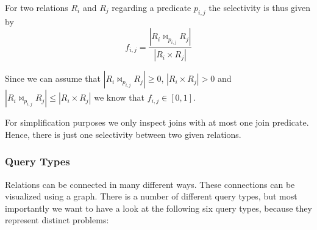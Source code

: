 For two relations $R_i$ and $R_j$ regarding a predicate $p_{i,j}$ the selectivity is thus given by 
\begin{equation}
f_{i,j} = \frac{|R_i\Join_{p_{i,j}}R_j|}{|R_i \times R_j|}	
\end{equation}

\begin{note}
Since we can assume that $|R_i\Join_{p_{i,j}}R_j| \geq 0$, $|R_i \times R_j| > 0$ and $|R_i\Join_{p_{i,j}}R_j| \leq |R_i \times R_j|$ we know that $f_{i,j} \in [0,1]$.
\end{note}

For simplification purposes we only inspect joins with at most one join predicate. Hence, there is just one selectivity between two given relations.

\subsubsection{Query Types}
\label{subsub:query-types}

Relations can be connected in many different ways. These connections can be visualized using a graph. There is a number of different query types, but most importantly we want to have a look at the following six query types, because they represent distinct problems:

